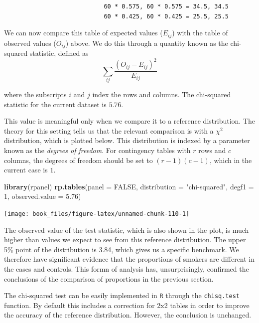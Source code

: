 \documentclass[
]{book}
\newenvironment{Shaded}{\begin{snugshade}}{\end{snugshade}}
\newcommand{\AttributeTok}[1]{\textcolor[rgb]{0.13,0.29,0.53}{#1}}
\newcommand{\ConstantTok}[1]{\textcolor[rgb]{0.56,0.35,0.01}{#1}}
\newcommand{\DecValTok}[1]{\textcolor[rgb]{0.00,0.00,0.81}{#1}}
\newcommand{\FloatTok}[1]{\textcolor[rgb]{0.00,0.00,0.81}{#1}}
\newcommand{\FunctionTok}[1]{\textcolor[rgb]{0.13,0.29,0.53}{\textbf{#1}}}
\newcommand{\NormalTok}[1]{#1}
\newcommand{\StringTok}[1]{\textcolor[rgb]{0.31,0.60,0.02}{#1}}
\begin{document}
\begin{verbatim}
                            60 * 0.575, 60 * 0.575 = 34.5, 34.5
                            60 * 0.425, 60 * 0.425 = 25.5, 25.5
\end{verbatim}

We can now compare this table of expected values (\(E_{ij}\)) with the table of observed values (\(O_{ij}\)) above. We do this through a quantity known as the chi-squared statistic, defined as
\[
      \sum_{ij} \frac{(O_{ij} - E_{ij})^2}{E_{ij}}
\]

where the subscripts \(i\) and \(j\) index the rows and columns. The chi-squared statistic for the current dataset is \(5.76\).

This value is meaningful only when we compare it to a reference distribution. The theory for this setting tells us that the relevant comparison is with a \(\chi^2\) distribution, which is plotted below. This distribution is indexed by a parameter known as the \emph{degrees of freedom}. For contingency tables with \(r\) rows and \(c\) columns, the degrees of freedom should be set to \((r-1)(c-1)\), which in the current case is \(1\).

\begin{Shaded}
\begin{Highlighting}[]
\FunctionTok{library}\NormalTok{(rpanel)}
\FunctionTok{rp.tables}\NormalTok{(}\AttributeTok{panel =} \ConstantTok{FALSE}\NormalTok{, }\AttributeTok{distribution =} \StringTok{"chi{-}squared"}\NormalTok{, }\AttributeTok{degf1 =} \DecValTok{1}\NormalTok{, }\AttributeTok{observed.value =} \FloatTok{5.76}\NormalTok{)}
\end{Highlighting}
\end{Shaded}

\begin{center}\texttt{[image: book\_files/figure-latex/unnamed-chunk-110-1]} \end{center}

The observed value of the test statistic, which is also shown in the plot, is much higher than values we expect to see from this reference distribution. The upper 5\% point of the distribution is 3.84, which gives us a specific benchmark. We therefore have significant evidence that the proportions of smokers are different in the cases and controls. This formn of analysis has, unsurprisingly, confirmed the conclusions of the comparison of proportions in the previous section.

The chi-squared test can be easily implemented in \texttt{R} through the \texttt{chisq.test} function. By default this includes a correction for 2x2 tables in order to improve the accuracy of the reference distribution. However, the conclusion is unchanged.
\end{document}
